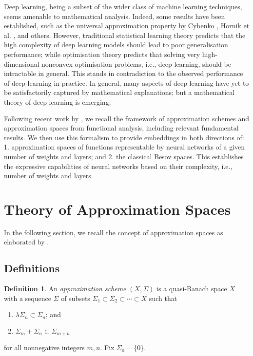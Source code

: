 \documentclass{article}
\theoremstyle{definition}
\newtheorem{definition}[theorem]{Definition}
\theoremstyle{remark}
\begin{document}
Deep learning, being a subset of the wider class of machine learning techniques, seems amenable to mathematical analysis. Indeed, some results have been established, such as the universal approximation property by Cybenko \cite{cybenko_approximation_1989}, Hornik et al. \cite{hornik_multilayer_1989}, and others. However, traditional statistical learning theory predicts that the high complexity of deep learning models should lead to poor generalisation performance; while optimisation theory predicts that solving very high-dimensional nonconvex optimisation problems, i.e., deep learning, should be intractable in general. This stands in contradiction to the observed performance of deep learning in practice. In general, many aspects of deep learning have yet to be satisfactorily captured by mathematical explanations; but a mathematical theory of deep learning is emerging.

Following recent work by \cite{gribonval_approximation_2022}, we recall the framework of approximation schemes and approximation spaces from functional analysis, including relevant fundamental results. We then use this formalism to provide embeddings in both directions of: 1. approximation spaces of functions representable by neural networks of a given number of weights and layers; and 2. the classical Besov spaces. This establishes the expressive capabilities of neural networks based on their complexity, i.e., number of weights and layers.



\section{Theory of Approximation Spaces}
In the following section, we recall the concept of approximation spaces as elaborated by \cite{pietsch_approximation_1981}.


\subsection{Definitions}

\begin{definition}
    An \textit{approximation scheme} $(X,\Sigma)$ is a quasi-Banach space $X$ with a sequence $\Sigma$ of subsets $\Sigma_1 \subset \Sigma_2 \subset \cdots \subset X$ such that
    \begin{enumerate}
        \item $\lambda\Sigma_n \subset \Sigma_n$; and
        \item $\Sigma_m + \Sigma_n \subset \Sigma_{m+n}$
    \end{enumerate}
    for all nonnegative integers $m,n$. Fix $\Sigma_0 = \{0\}$.
\end{definition}
\end{document}
